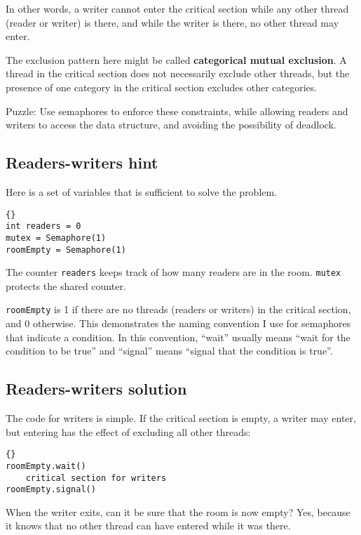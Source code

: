\documentclass{book}
\newcommand{\clearemptydoublepage}{\newpage\cleardoublepage}
\begin{document}
In other words, a writer cannot enter the critical section while
any other thread (reader or writer) is there, and while the writer
is there, no other thread may enter.

The exclusion pattern here might be called {\bf categorical
mutual exclusion}.  A thread in the critical section
does not necessarily exclude other threads, but the presence
of one category in the critical section excludes other
categories.

Puzzle: Use semaphores to enforce these constraints, while allowing
readers and writers to access the data structure, and avoiding
the possibility of deadlock.


\clearemptydoublepage
\subsection{Readers-writers hint}

Here is a set of variables that is sufficient to solve the
problem.

\begin{lstlisting}[title={Readers-writers initialization}]{}
int readers = 0
mutex = Semaphore(1)
roomEmpty = Semaphore(1)
\end{lstlisting}

The counter {\tt readers} keeps track of how many readers
are in the room.  {\tt mutex} protects the shared counter.

{\tt roomEmpty} is 1 if there are no threads (readers or writers) in
the critical section, and 0 otherwise.  This demonstrates the naming
convention I use for semaphores that indicate a condition.  In
this convention, ``wait'' usually means ``wait for the condition to
be true'' and ``signal'' means ``signal that the condition is true''.


\clearemptydoublepage
\subsection {Readers-writers solution}

The code for writers is simple.  If the critical section
is empty, a writer may enter, but entering has the effect
of excluding all other threads:

\begin{lstlisting}[title={Writers solution}]{}
roomEmpty.wait()
    critical section for writers
roomEmpty.signal()
\end{lstlisting}

When the writer exits, can it be sure that the room is
now empty?  Yes, because it knows that no other thread can
have entered while it was there.
\end{document}
